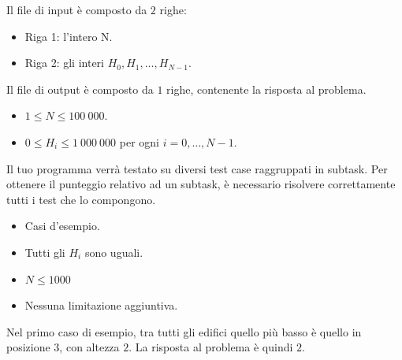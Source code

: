 Il file di input è composto da $2$ righe:
\begin{itemize}
    \item Riga 1: l'intero N.
    \item Riga 2: gli interi $H_0, H_1, \dots, H_{N-1}$.
\end{itemize}

Il file di output è composto da $1$ righe, contenente la risposta al problema.


\Constraints

\begin{itemize}[nolistsep, itemsep=2mm]
    \item $1 \le N \le 100\:000$.
    \item $0 \le H_i \le 1\:000\:000$ per ogni $i = 0, \dots,N-1$.
\end{itemize}


\Scoring

Il tuo programma verrà testato su diversi test case raggruppati in subtask.
Per ottenere il punteggio relativo ad un subtask,
è necessario risolvere correttamente tutti i test che lo compongono.

\begin{itemize}[nolistsep,itemsep=2mm]
    \item \subtask Casi d'esempio.
    \item \subtask Tutti gli $H_i$ sono uguali.
    \item \subtask $N \le 1000$
    \item \subtask Nessuna limitazione aggiuntiva.
\end{itemize}


\Examples

\begin{example}
\end{example}


\Explanation

Nel primo caso di esempio, tra tutti gli edifici quello più basso è quello in posizione $3$, con altezza $2$.
La risposta al problema è quindi $2$.
